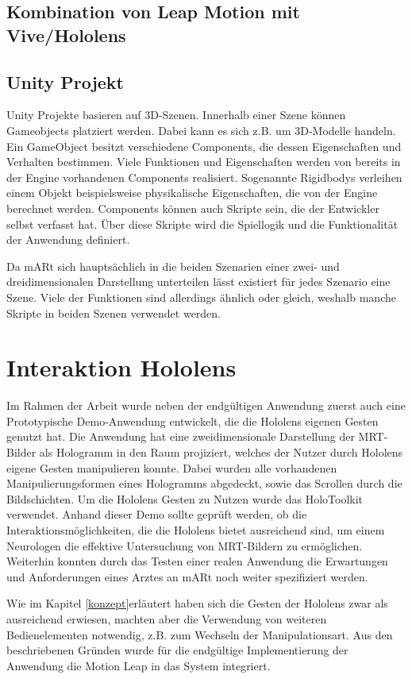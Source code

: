 \subsection{Kombination von Leap Motion mit Vive/Hololens}
\subsection{Unity Projekt}

Unity Projekte basieren auf 3D-Szenen. Innerhalb einer Szene können Gameobjects platziert werden. Dabei kann es sich z.B. um 3D-Modelle handeln. Ein GameObject besitzt verschiedene Components, die dessen Eigenschaften und Verhalten bestimmen. Viele Funktionen und Eigenschaften werden von bereits in der Engine vorhandenen Components realisiert. Sogenannte Rigidbodys verleihen einem Objekt beispielsweise physikalische Eigenschaften, die von der Engine berechnet werden. Components können auch Skripte sein, die der Entwickler selbst verfasst hat. Über diese Skripte wird die Spiellogik und die Funktionalität der Anwendung definiert. 

Da mARt sich hauptsächlich in die beiden Szenarien einer zwei- und dreidimensionalen Darstellung unterteilen lässt existiert für jedes Szenario eine Szene.
Viele der Funktionen sind allerdings ähnlich oder gleich, weshalb manche Skripte in beiden Szenen verwendet werden. 

\section{Interaktion Hololens}

Im Rahmen der Arbeit wurde neben der endgültigen Anwendung zuerst auch eine Prototypische Demo-Anwendung entwickelt, die die Hololens eigenen Gesten genutzt hat. Die Anwendung hat eine zweidimensionale Darstellung der MRT-Bilder als Hologramm in den Raum projiziert, welches der Nutzer durch Hololens eigene Gesten manipulieren konnte. Dabei wurden alle vorhandenen Manipulierungsformen eines Hologramms abgedeckt, sowie das Scrollen durch die Bildschichten. Um die Hololens Gesten zu Nutzen wurde das HoloToolkit verwendet. 
Anhand dieser Demo sollte geprüft werden, ob die Interaktionsmöglichkeiten, die die Hololens bietet ausreichend sind, um einem Neurologen die effektive Untersuchung von MRT-Bildern zu ermöglichen.
Weiterhin konnten durch das Testen einer realen Anwendung die Erwartungen und Anforderungen eines Arztes an mARt noch weiter spezifiziert werden.  

Wie im Kapitel \ref{konzept}erläutert haben sich die Gesten der Hololens zwar als ausreichend erwiesen, machten aber die Verwendung von weiteren Bedienelementen notwendig, z.B. zum Wechseln der Manipulationsart. Aus den beschriebenen Gründen wurde für die endgültige Implementierung der Anwendung die Motion Leap in das System integriert.

